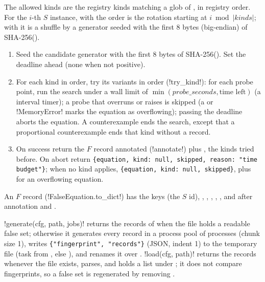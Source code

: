 \begin{algorithm}\label{alg:bench-order}
The allowed kinds are the registry kinds matching a glob of , in
registry order. For the $i$-th $S$ instance, with  the order is the rotation
starting at $i \bmod |\mathit{kinds}|$; with  it is a shuffle by a generator seeded
with the first 8 bytes (big-endian) of SHA-256().
\end{algorithm}

\begin{algorithm}
\begin{enumerate}
\item Seed the candidate generator with the first 8 bytes of SHA-256().
  Set the deadline  ahead (none when not positive).
\item For each kind in order, try its variants in order (\py!try_kind!): for each probe point,
  run the search under a wall limit of $\min(\mathit{probe\_seconds}, \text{time left})$ (a
   interval timer); a probe that overruns or raises is skipped (a
   or \py!MemoryError! marks the equation as overflowing); passing the
  deadline aborts the equation. A counterexample ends the search, except that a proportional
   counterexample ends that kind without a record.
\item On success return the $F$ record annotated (\py!annotate!) plus , the kinds
  tried before. On abort return \texttt{\{equation, kind: null, skipped, reason: "time budget"\}};
  when no kind applies, \texttt{\{equation, kind: null, skipped\}}, plus  for an overflowing equation.
\end{enumerate}
\end{algorithm}

An $F$ record (\py!FalseEquation.to_dict!) has the keys  (the $S$ id),
, , , , , and after
annotation  and .

\py!generate(cfg, path, jobs)! returns the records of  when the file holds a readable
false set; otherwise it generates every record in a process pool of  processes (chunk
size 1), writes \texttt{\{"fingerprint", "records"\}} (JSON, indent 1) to the temporary file
 (task from , else ), and
renames it over . \py!load(cfg, path)! returns the records whenever the file exists,
parses, and holds a list under ; it does not compare fingerprints, so a false set
is regenerated by removing .

